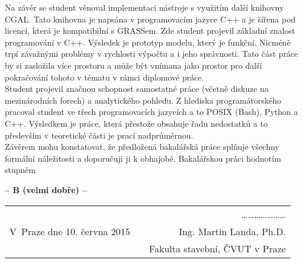 \documentclass[czech,11pt,a4paper]{article}
\begin{document}
Na závěr se student věnoval implementaci nástroje s využitím další
knihovny CGAL. Tato knihovna je napsána v programovacím jazyce C++ a
je šířena pod licencí, která je kompatibilní s GRASSem. Zde student
projevil základní znalost programování v C++. Výsledek je prototyp
modelu, který je funkční. Nicméně trpí závažnými problémy v rychlosti
výpočtu a i jeho správnosti. Tato část práce by si zasložila více
prostoru a může být vnímana jako prostor pro další pokračování tohoto
v tématu v rámci diplomové práce.
\\

Student projevil značnou schopnost samostatné práce (včetně diskuze na
mezinárodních forech) a analytického pohledu. Z hlediska
programátorského pracoval student ve třech programovacích jazycích a
to POSIX (Bash), Python a C++. Výsledkem je práce, která přestože
obsahuje řadu nedostatků a to především v teoretické části je prací
nadprůměrnou.
\\
\newpage
Závěrem mohu konstatovat, že předložená bakalářská práce splňuje
všechny formální náležitosti a doporučuji ji k obhajobě. Bakalářskou
práci hodnotím stupněm

\vskip 2cm

\begin{center}
{\bf -- B (velmi dobře)  --}
\end{center}

\vskip 2cm

\begin{tabular}{lp{}r}
& & \ldots\ldots\ldots\ldots\ldots\ldots\ldots \\
V~Praze dne 10. června 2015 & & Ing. Martin Landa, Ph.D. \\
& & Fakulta stavební, ČVUT v Praze \\
\end{tabular}
\end{document}
